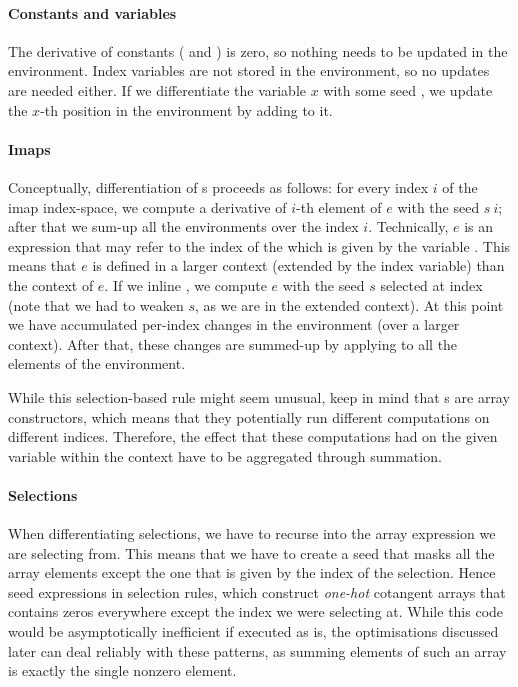 \paragraph{Constants and variables} The derivative of constants ( and )
is zero, so nothing needs to be updated in the environment.  Index variables are
not stored in the environment, so no updates are needed either.  If we differentiate
the variable $x$ with some seed , we update the $x$-th position in the environment
by adding  to it.

\paragraph{Imaps} Conceptually, differentiation of s proceeds as follows:
for every index $i$ of the imap index-space, we compute a derivative of $i$-th
element of $e$ with the seed $s\ i$; after that we sum-up all the environments
over the index $i$.  Technically, $e$ is an expression that may refer to the index
of the  which is given by the variable .  This means that $e$
is defined in a larger context (extended by the index variable) than the context
of  $e$.  If we inline , we compute  $e$ with the seed
$s$ selected at index  (note that we had to weaken $s$, as we are in
the extended context).  At this point we have accumulated per-index changes
in the environment (over a larger context).  After that, these changes are
summed-up by applying  to all the elements of the environment.

While this selection-based rule might seem unusual, keep in mind that s
are array constructors, which means that they potentially run different computations
on different indices.  Therefore, the effect that these computations had on the
given variable within the context have to be aggregated through summation.


\paragraph{Selections} When differentiating selections, we have to
recurse into the array expression we are selecting from. This means
that we have to create a seed that masks all the array elements except
the one that is given by the index of the selection. Hence seed
expressions in selection rules, which construct \emph{one-hot}
cotangent arrays that contains zeros everywhere except the index we
were selecting at. While this code would be asymptotically inefficient
if executed as is, the optimisations discussed later can deal reliably
with these patterns, as summing elements of such an array is exactly
the single nonzero element.

